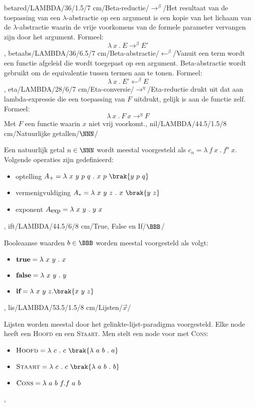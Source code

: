 betared/LAMBDA/36/1.5/7 cm/Beta-reductie/$\rightarrow^{\beta}$/{Het resultaat van de toepassing van een $\lambda$-abstractie op een argument is een kopie van het lichaam van de $\lambda$-abstractie waarin de vrije voorkomens van de formele parameter vervangen zijn door het argument. Formeel:\[\lambda\ x\ .\ E\rightarrow^{\beta}E'\]},
betaabs/LAMBDA/36/6.5/7 cm/Beta-abstractie/$\leftarrow^{\beta}$/{Vanuit een term wordt een functie afgeleid die wordt toegepast op een argument. Beta-abstractie wordt gebruikt om de equivalentie tussen termen aan te tonen. Formeel:\[\lambda\ x\ .\ E'\leftarrow^{\beta}E\]},
eta/LAMBDA/28/6/7 cm/Eta-conversie/$\rightarrow^{\eta}$/{Eta-reductie drukt uit dat aan lambda-expressie die een toepassing van $F$ uitdrukt, gelijk is aan de functie zelf. Formeel:\[\lambda\ x\ .\ F\ x\rightarrow^{\eta}F\]Met $F$ een functie waarin $x$ niet vrij voorkomt.},
nil/LAMBDA/44.5/1.5/8 cm/Natuurlijke getallen/$\NNN$/{Een natuurlijk getal $n\in\NNN$ wordt meestal voorgesteld als $c_n=\lambda\ f\ x\ .\ f^n\ x$. Volgende operaties zijn gedefinieerd:\begin{itemize}\item optelling $A_{+}=\lambda\ x\ y\ p\ q\ .\ x\ p\ \brak{y\ p\ q}$\item vermenigvuldiging $A_{*}=\lambda\ x\ y\ z\ .\ x\ \brak{y\ z}$\item exponent $A_{\mbox{\small exp}}=\lambda\ x\ y\ .\ y\ x$\end{itemize}},
ift/LAMBDA/44.5/6/8 cm/{True, False en If}/$\BBB$/{Booleaanse waarden $b\in\BBB$ worden meestal voorgesteld als volgt:\begin{itemize}\item $\mbox{\bf true}=\lambda\ x\ y\ .\ x$\item $\mbox{\bf false}=\lambda\ x\ y\ .\ y$\item $\mbox{\bf if}=\lambda\ x\ y\ z.\brak{x\ y\ z}$\end{itemize}},
lis/LAMBDA/53.5/1.5/8 cm/{Lijsten}/$\vec{x}$/{Lijsten worden meestal door het gelinkte-lijst-paradigma voorgesteld. Elke node heeft een \textsc{Hoofd} en een \textsc{Staart}. Men stelt een node voor met \textsc{Cons}:\begin{itemize}\item $\mbox{\sc Hoofd}=\lambda\ c\ .\ c\ \brak{\lambda\ a\ b\ .\ a}$\item $\mbox{\sc Staart}=\lambda\ c\ .\ c\ \brak{\lambda\ a\ b\ .\ b}$\item $\mbox{\sc Cons}=\lambda\ a\ b\ f.f\ a\ b$\end{itemize}},

